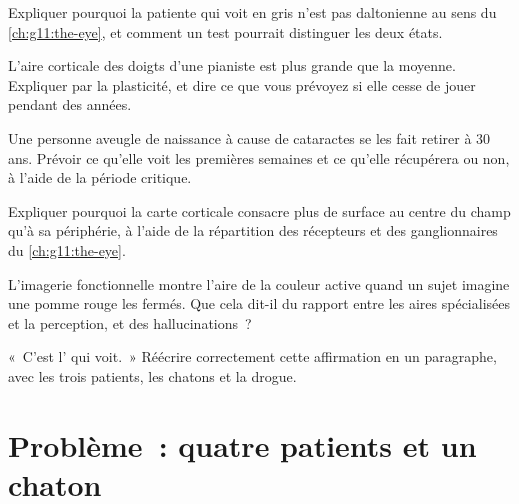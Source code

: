 \begin{exercise}[$\star\star$]\label{exo:g11:vision-and-brain:10}
Expliquer pourquoi la patiente qui voit en gris n'est pas daltonienne
au sens du \cref{ch:g11:the-eye}, et comment un test pourrait
distinguer les deux états.
\end{exercise}

\begin{exercise}[$\star\star$]\label{exo:g11:vision-and-brain:11}
L'aire corticale des doigts d'une pianiste est plus grande que la
moyenne. Expliquer par la plasticité, et dire ce que vous prévoyez si
elle cesse de jouer pendant des années.
\end{exercise}

\begin{exercise}[$\star\star\star$]\label{exo:g11:vision-and-brain:12}
Une personne aveugle de naissance à cause de cataractes se les fait
retirer à 30 ans. Prévoir ce qu'elle voit les premières semaines et ce
qu'elle récupérera ou non, à l'aide de la période critique.
\end{exercise}

\begin{exercise}[$\star\star\star$]\label{exo:g11:vision-and-brain:13}
Expliquer pourquoi la carte corticale consacre plus de surface au
centre du champ qu'à sa périphérie, à l'aide de la répartition des
récepteurs et des  ganglionnaires du \cref{ch:g11:the-eye}.
\end{exercise}

\begin{exercise}[$\star\star\star$]\label{exo:g11:vision-and-brain:14}
L'imagerie fonctionnelle montre l'aire de la couleur active quand un
sujet imagine une pomme rouge les  fermés. Que cela dit-il du
rapport entre les aires spécialisées et la perception, et des
hallucinations~?
\end{exercise}

\begin{exercise}[$\star\star\star$]\label{exo:g11:vision-and-brain:15}
«~C'est l' qui voit.~» Réécrire correctement cette affirmation en un
paragraphe, avec les trois patients, les chatons et la drogue.
\end{exercise}

\section{Problème~: quatre patients et un chaton}

